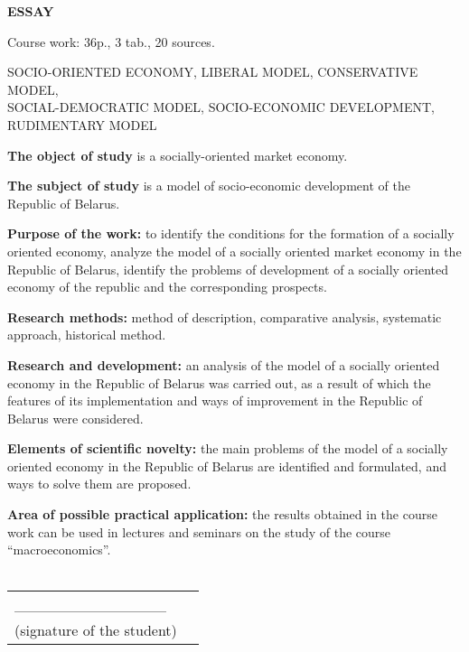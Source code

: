 \documentclass[14pt,a4paper]{article}
\begin{document}
    \newpage
    \begin{center}
        \textbf{\LARGE{ESSAY}}
    \end{center}
    \par
    Course work: 36p., 3 tab., 20 sources.
    \\
    \par
    \large{SOCIO-ORIENTED ECONOMY, LIBERAL MODEL, CONSERVATIVE MODEL,}
    \\
    \large{SOCIAL-DEMOCRATIC MODEL, SOCIO-ECONOMIC DEVELOPMENT,}
    \\
    \large{RUDIMENTARY MODEL}
    \\
    \par
    \textbf{The object of study} is a socially-oriented market economy.
    \par
    \textbf{The subject of study} is a model of socio-economic development of the Republic of Belarus.
    \par
    \textbf{Purpose of the work:} to identify the conditions for the formation of a socially oriented economy, analyze the model of a socially oriented market economy in the Republic of Belarus, identify the problems of development of a socially oriented economy of the republic and the corresponding prospects.
    \par
    \textbf{Research methods:} method of description, comparative analysis, systematic approach, historical method.
    \par
    \textbf{Research and development:} an analysis of the model of a socially oriented economy in the Republic of Belarus was carried out, as a result of which the features of its implementation and ways of improvement in the Republic of Belarus were considered.
    \par
    \textbf{Elements of scientific novelty:} the main problems of the model of a socially oriented economy in the Republic of Belarus are identified and formulated, and ways to solve them are proposed.
    \par
    \textbf{Area of possible practical application:} the results obtained in the course work can be used in lectures and seminars on the study of the course ``macroeconomics''.
    \\
    \\
    \hfill\begin{tabular}{lp{.5\linewidth}@{}}
              \_\_\_\_\_\_\_\_\_\_\_\_\_\_
              \\
              (signature of the student) \\
    \end{tabular}
\end{document}
